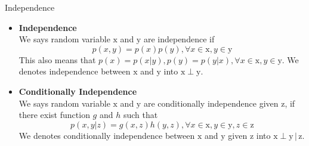 \documentclass{bredelebeamer}
\begin{document}
\begin{frame}{Independence}
  \begin{itemize}
    \item\begin{justify}
      \textbf{Independence}\\
      We says random variable $\mathrm{x}$ and $\mathrm{y}$ are independence if
      \begin{equation}
        p(x,y) = p(x)p(y), \forall x \in \mathrm{x}, y \in \mathrm{y}
      \end{equation}
      This also means that $p(x) = p(x|y), p(y) = p(y|x), \forall x \in \mathrm{x}, y \in \mathrm{y}$.
      We denotes independence between $\mathrm{x}$ and $\mathrm{y}$ into $\mathrm{x}\perp\mathrm{y}$.
    \end{justify}
    \item\begin{justify}
      \textbf{Conditionally Independence}\\
      We says random variable $\mathrm{x}$ and $\mathrm{y}$ are conditionally
      independence given $\mathrm{z}$, if there exist function $g$ and $h$ such that
      \begin{equation}
        p(x,y|z) = g(x,z)h(y,z), \forall x \in \mathrm{x}, y \in \mathrm{y}, z \in \mathrm{z}
      \end{equation}
      We denotes conditionally independence between $\mathrm{x}$ and $\mathrm{y}$
      given $\mathrm{z}$ into $\mathrm{x}\perp\mathrm{y}\,|\,\mathrm{z}$.
    \end{justify}
  \end{itemize}
\end{frame}
\end{document}
